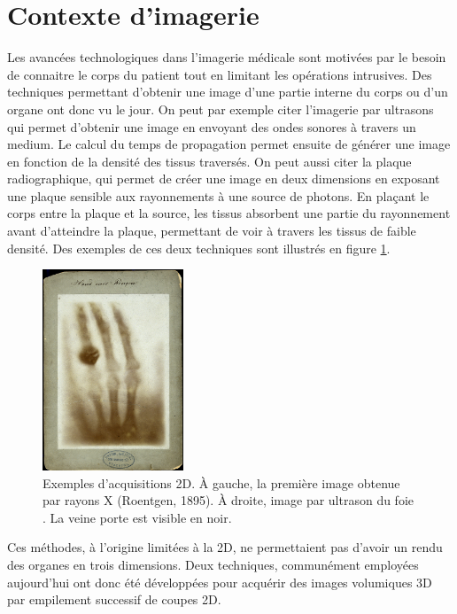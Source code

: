 \section{Contexte d'imagerie}
\label{sec:contexte:images}
Les avancées technologiques dans l'imagerie médicale sont motivées par le besoin de connaitre le corps du patient tout en limitant les opérations intrusives. Des techniques permettant d'obtenir une image d'une partie interne du corps ou d'un organe ont donc vu le jour. On peut par exemple citer l'imagerie par ultrasons qui permet d'obtenir une image en envoyant des ondes sonores à travers un medium. Le calcul du temps de propagation permet ensuite de générer une image en fonction de la densité des tissus traversés. On peut aussi citer la plaque radiographique, qui permet de créer une image en deux dimensions en exposant une plaque sensible aux rayonnements à une source de photons. En plaçant le corps entre la plaque et la source, les tissus absorbent une partie du rayonnement avant d'atteindre la plaque, permettant de voir à travers les tissus de faible densité. Des exemples de ces deux techniques sont illustrés en figure \ref{fig:2D imaging}.
\begin{figure}
    \centering
    \includegraphics[height=6cm]{Images/first_CT.png}
    \caption{Exemples d'acquisitions 2D. À gauche, la première image obtenue par rayons X (Roentgen, 1895). À droite, image par ultrason du foie \protect\footnotemark. La veine porte est visible en noir.}
    \label{fig:2D imaging}
\end{figure}

Ces méthodes, à l'origine limitées à la 2D, ne permettaient pas d'avoir un rendu des organes en trois dimensions. Deux techniques, communément employées aujourd'hui ont donc été développées pour acquérir des images volumiques 3D par empilement successif de coupes 2D.
